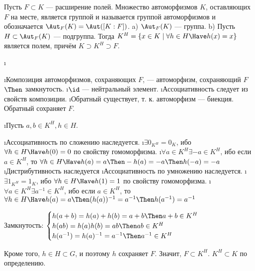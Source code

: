 \begin{problem}
Пусть $F \subset K$ — расширение полей. Множество автоморфизмов $K$, оставляющих $F$ на месте, является группой и называется группой автоморфизмов и обозначается $\Aut_F(K) = \Aut([K : F])$.
a) $\Aut_F(K)$ — группа.
b) Пусть $H \subset \Aut_F(K)$ --- подгруппа. Тогда $K^H = \{x \in K \mid \forall h \in H \Have h(x) = x\}$ является полем, причём $K \supset K^H \supset F$.
\end{problem}
\begin{solution}
\begin{enumerate}[label=\asbuk{enumi})]
\i
	\begin{itemize}
	\i Композиция автоморфизмов, сохраняющих \(F\), --- автоморфизм, сохраняющий \(F\) \(\Then\) замкнутость.
	\i \(\id\) --- нейтральный элемент.
	\i Ассоциативность следует из свойств композиции.
	\i Обратный существует, т. к. автоморфизм --- биекция. Обратный сохраняет \(F\).
	\end{itemize}
\i Пусть \(a, b \in K^H, h \in H\). 
	\begin{itemize}
	\i Ассоциативность по сложению наследуется.
	\i $\exists 0_{K^H} = 0_K$, ибо $\forall h \in H \Have h(0)=0$ по свойству гомоморфизма.
	\i $\forall a \in K^H \exists -a \in K^H$, ибо если $a \in K^H$, то $\forall h \in H \Have h(a) = a \Then -h(a) = -a \Then h(-a) = -a$
	\i Дистрибутивность наследуется
	\i Ассоциативность по умножению наследуется.
	\i $\exists 1_{K^H} = 1_K$, ибо $\forall h \in H \Have h(1)=1$ по свойству гомоморфизма.
	\i $\forall a \in K^H \exists a^{-1} \in K^H$, ибо если $a \in K^H$, то $\forall h \in H \Have h(a) = a \Then (h(a))^{-1} = a^{-1} \Then h(a^{-1}) = a^{-1}$
	\end{itemize}
	Замкнутость:
	$\begin{cases}
	h(a + b) = h(a) + h(b) = a + b \Then a + b \in K^H \\
	h(ab) = h(a)h(b) = ab \Then ab \in K^H \\
	h(a^{-1}) = h(a)^{-1} = a^{-1} \Then a^{-1} \in K^H
	\end{cases}$

	Кроме того, \(h \in H \subset G\), и поэтому \(h\) сохраняет \(F\). Значит, \(F \subset K^H\).
	\(K^H \subset K\) по определению.
\end{enumerate}
\end{solution}

